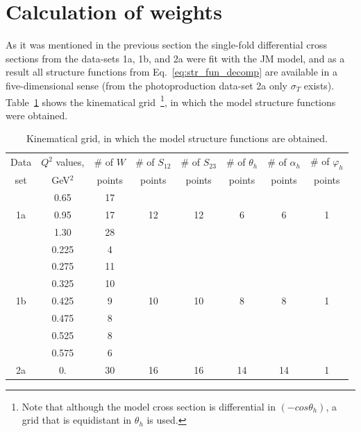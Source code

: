 \section{Calculation of weights}
\label{sect:cr_sect_extr_intr}


As it was mentioned in the previous section the single-fold differential cross sections from the data-sets 1a, 1b, and 2a were fit with the JM model, and as a result all structure functions from Eq.~\eqref{eq:str_fun_decomp} are available in a five-dimensional sense (from the photoproduction data-set 2a only $\sigma_{T}$ exists). Table~\ref{tab:mod_grid} shows the kinematical grid~\footnote[1]{Note that although the model cross section is differential in $(-cos \theta_{h})$, a grid that is equidistant in $\theta_{h}$ is used.}, in which the model structure functions were obtained.  


\begin{table}[h]%
\begin{center}
  \renewcommand{\arraystretch}{1.2}
\begin{tabular}{|c|c|c|c|c|c|c|c|}

\hline
Data & $Q^2$ values, & \# of $W$  & \# of $S_{12}$ & \# of $S_{23}$ & \# of $\theta_{h}$ & \# of $\alpha_{h}$  & \# of $\varphi_{h}$ \\
 set &  GeV$^2$ &  points &  points& points &  points &  points &  points\\
\hline
   &  0.65 & 17 &    &    &   &   & \\
1a &  0.95 & 17 & 12 & 12 & 6 & 6 & 1\\
   &  1.30 & 28 &    &    &   &   & \\
\hline
   &  0.225 & 4  &   &    &   &   &  \\
   &  0.275 & 11 &   &    &   &   &  \\
   &  0.325 & 10 &   &    &   &   &  \\
1b &  0.425 &  9 & 10&10  & 8 & 8 & 1\\
   &  0.475 &  8 &   &    &   &   &  \\
   &  0.525 &  8 &   &    &   &   &  \\
   &  0.575 &  6 &   &    &   &   &  \\
\hline
2a &  0.   &  30& 16&16  & 14&14 & 1\\
\hline
\end{tabular}
\caption{\small Kinematical grid, in which the model structure functions are obtained. \label{tab:mod_grid}}
\end{center}
\end{table}

